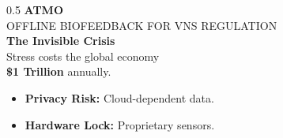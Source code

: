 \documentclass[aspectratio=169, xcolor=table]{beamer}
\newcommand{\glowemerald}[1]{{\color{darkgreen}\textbf{#1}}}
\newcommand{\glowblue}[1]{{\color{darkblue}\textbf{#1}}}
\begin{document}
\begin{frame}
    \begin{columns}[T]
        \begin{column}{0.5\textwidth}
            \vspace{0.5cm}
            {\Large \glowemerald{ATMO}} \\
            \vspace{0.2cm}
            {\scriptsize \color{darkgreen} OFFLINE BIOFEEDBACK FOR VNS REGULATION} \\
            \vspace{1cm}
            {\large \glowblue{The Invisible Crisis}} \\
            \vspace{0.3cm}
            {\Large Stress costs the global economy \\ \glowblue{\$1 Trillion} annually.} \\
            \vspace{0.5cm}
            \begin{itemize}
                \item \small \color{textdark} \textbf{Privacy Risk:} Cloud-dependent data.
                \item \small \color{textdark} \textbf{Hardware Lock:} Proprietary sensors.
            \end{itemize}
        \end{column}
        

\end{columns}
\end{frame}
\end{document}

